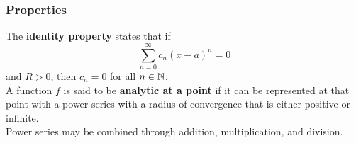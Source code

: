 \documentclass[./Differential Equations.tex]{subfiles}
\begin{document}
			\subsubsection*{Properties}
				The \textbf{identity property} states that if
					\[\sum_{n = 0}^\infty c_n(x - a)^n = 0\]
					and \(R > 0\), then \(c_n = 0\) for all \(n \in \mathbb{N}\). \\
				A function \(f\) is said to be \textbf{analytic at a point} if it can be represented at that point with a power series with a radius of convergence that is either positive or infinite. \\
				Power series may be combined through addition, multiplication, and division.
				\callout{17}{\paragraph{Common Maclaurin Series}
					\[\def\arraystretch{2}\begin{array}{|c|c|c|}\hline
						f(x) & \text{Maclaurin Series} & \text{Interval of Convergence} \\\hline
						e^x & \displaystyle\sum_{n = 0}^\infty \frac{1}{n!}x^n & \R \\
						\cos x & \displaystyle\sum_{n = 0}^\infty \frac{(-1)^n}{(2n)!}x^{2n} & \R \\
						\sin x & \displaystyle\sum_{n = 0}^\infty \frac{(-1)^n}{(2n + 1)!}x^{2n + 1} & \R \\
						\arctan x & \displaystyle\sum_{n = 0}^\infty \frac{(-1)^n}{2n + 1}x^{2n + 1} & [-1, 1] \\
						\cosh x & \displaystyle\sum_{n = 0}^\infty \frac{1}{(2n)!}x^{2n} & \R \\
						\sinh x & \displaystyle\sum_{n = 0}^\infty \frac{1}{(2n + 1)!}x^{2n + 1} & \R \\
						\ln(1 + x) & \displaystyle\sum_{n = 1}^\infty \frac{(-1)^{n + 1}}{n}x^n & (-1, 1] \\
						\displaystyle\frac{1}{1 - x} & \displaystyle\sum_{n = 0}^\infty x^n & (-1, 1) \\\hline
					\end{array}\]
				}
\end{document}
